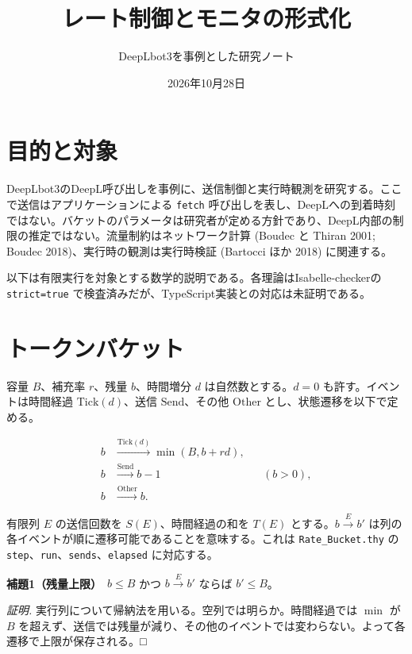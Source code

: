 \documentclass[
  japanese,
]{ltjsarticle}
\title{レート制御とモニタの形式化}
\subtitle{DeepLbot3を事例とした研究ノート}
\author{}
\date{2026年10月28日}
\begin{document}
\maketitle

\section{目的と対象}\label{ux76eeux7684ux3068ux5bfeux8c61}

DeepLbot3のDeepL呼び出しを事例に、送信制御と実行時観測を研究する。ここで送信はアプリケーションによる
\texttt{fetch}
呼び出しを表し、DeepLへの到着時刻ではない。バケットのパラメータは研究者が定める方針であり、DeepL内部の制限の推定ではない。流量制約はネットワーク計算
(Boudec と Thiran 2001; Boudec 2018)、実行時の観測は実行時検証 (Bartocci
ほか 2018) に関連する。

以下は有限実行を対象とする数学的説明である。各理論はIsabelle-checkerの
\texttt{strict=true}
で検査済みだが、TypeScript実装との対応は未証明である。

\section{トークンバケット}\label{ux30c8ux30fcux30afux30f3ux30d0ux30b1ux30c3ux30c8}

容量 \(B\)、補充率 \(r\)、残量 \(b\)、時間増分 \(d\)
は自然数とする。\(d=0\) も許す。イベントは時間経過
\(\mathrm{Tick}(d)\)、送信 \(\mathrm{Send}\)、その他 \(\mathrm{Other}\)
とし、状態遷移を以下で定める。

\[
\begin{aligned}
b &\xrightarrow{\mathrm{Tick}(d)} \min(B,b+rd),\\
b &\xrightarrow{\mathrm{Send}} b-1 && (b>0),\\
b &\xrightarrow{\mathrm{Other}} b.
\end{aligned}
\]

有限列 \(E\) の送信回数を \(S(E)\)、時間経過の和を \(T(E)\)
とする。\(b\xrightarrow{E}b'\)
は列の各イベントが順に遷移可能であることを意味する。これは
\texttt{Rate\_Bucket.thy} の
\texttt{step}、\texttt{run}、\texttt{sends}、\texttt{elapsed}
に対応する。

\textbf{補題1（残量上限）}　\(b\le B\) かつ \(b\xrightarrow{E}b'\)
ならば \(b'\le B\)。

\emph{証明.} 実行列について帰納法を用いる。空列では明らか。時間経過では
\(\min\) が \(B\)
を超えず、送信では残量が減り、その他のイベントでは変わらない。よって各遷移で上限が保存される。□
\end{document}
